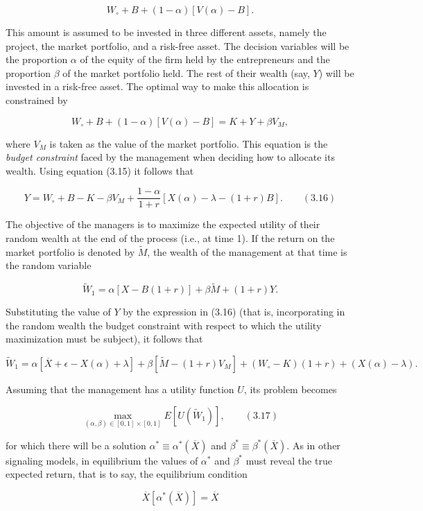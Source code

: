 \documentclass[11pt,a4paper]{article}
\begin{document}
\[W_\circ + B + (1 - \alpha)[V(\alpha) - B].\]

This amount is assumed to be invested in three different assets, namely the project, the market
portfolio, and a risk-free asset. The decision variables will be the proportion \(\alpha\) of the
equity of the firm held by the entrepreneurs and the proportion \(\beta\) of the market portfolio
held. The rest of their wealth (say, \(Y\)) will be invested in a risk-free asset. The optimal way
to make this allocation is constrained by

\[W_\circ + B + (1 - \alpha)[V(\alpha) - B] = K + Y + \beta V_M,\]

where \(V_M\) is taken as the value of the market portfolio. This equation is the \emph{budget
constraint} faced by the management when deciding how to allocate its wealth. Using equation (3.15)
it follows that

\[Y = W_\circ + B - K - \beta V_M + \frac{1 - \alpha}{1 + r}[X(\alpha) - \lambda - (1 + r)B]. \qquad (3.16)\]

The objective of the managers is to maximize the expected utility of their random wealth at the end
of the process (i.e., at time 1). If the return on the market portfolio is denoted by
\(\widetilde{M}\), the wealth of the management at that time is the random variable

\[\widetilde{W}_1 = \alpha[X - B(1 + r)] + \beta\widetilde{M} + (1 + r)Y.\]

Substituting the value of \(Y\) by the expression in (3.16) (that is, incorporating in the random
wealth the budget constraint with respect to which the utility maximization must be subject), it
follows that

\[\widetilde{W}_1 = \alpha[\overline{X} + \epsilon - X(\alpha) + \lambda] + \beta[\widetilde{M} - (1 + r)V_M] + (W_\circ - K)(1 + r) + (X(\alpha) - \lambda).\]

Assuming that the management has a utility function \(U\), its problem becomes

\[\max_{(\alpha, \beta) \in [0,1] \times [0,1]} E[U(\widetilde{W}_1)], \qquad (3.17)\]

for which there will be a solution \(\alpha^* \equiv \alpha^*(\overline{X})\) and
\(\beta^* \equiv \beta^*(\overline{X})\). As in other signaling models, in equilibrium the values of
\(\alpha^*\) and \(\beta^*\) must reveal the true expected return, that is to say, the equilibrium
condition

\[\overline{X}[\alpha^*(\overline{X})] = \overline{X}\]
\end{document}
